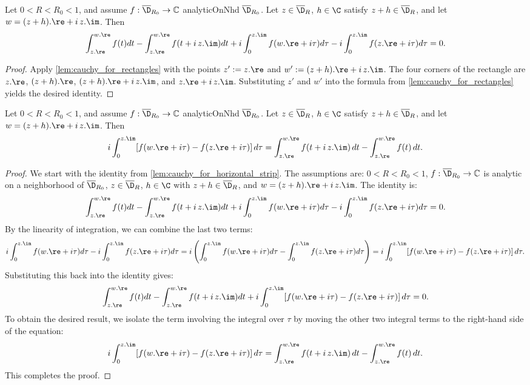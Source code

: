 \begin{lemma} \label{lem:cauchy_for_horizontal_strip}
\leanok
Let $0<R<R_0<1$, and assume $f:\overline{\D}_{R_0}\to\mathbb{C}$ analyticOnNhd $\overline{\D}_{R_0}$. Let $z \in \overline{\D}_R$, $h\in\C$ satisfy $z+h \in \overline{\D}_R$, and let $w = (z+h).\re + i\,z.\im$. Then
\[ \int_{z.\re}^{w.\re} f(t) dt - \int_{z.\re}^{w.\re} f(t + i\,z.\im) dt + i \int_{0}^{z.\im} f(w.\re + i\tau) d\tau - i \int_{0}^{z.\im} f(z.\re + i\tau) d\tau = 0. \]
\end{lemma}
\begin{proof}
\leanok
Apply \cref{lem:cauchy_for_rectangles} with the points $z' := z.\re$ and $w' := (z+h).\re + i\,z.\im$. The four corners of the rectangle are $z.\re$, $(z+h).\re$, $(z+h).\re + i\,z.\im$, and $z.\re + i\,z.\im$. Substituting $z'$ and $w'$ into the formula from \cref{lem:cauchy_for_rectangles} yields the desired identity.
\end{proof}

\begin{lemma}\label{lem:cauchy_rearrangement_step1}
\leanok
Let $0<R<R_0<1$, and assume $f:\overline{\D}_{R_0}\to\mathbb{C}$ analyticOnNhd $\overline{\D}_{R_0}$. Let $z \in \overline{\D}_R$, $h\in\C$ satisfy $z+h \in \overline{\D}_R$, and let $w = (z+h).\re + i\,z.\im$. Then
\[ i \int_0^{z.\im} [f(w.\re + i\tau) - f(z.\re + i\tau)]\,d\tau = \int_{z.\re}^{w.\re} f(t + i\,z.\im)\,dt - \int_{z.\re}^{w.\re} f(t)\,dt. \]
\end{lemma}
\begin{proof}\leanok
{}
We start with the identity from \cref{lem:cauchy_for_horizontal_strip}. The assumptions are: $0<R<R_0<1$, $f:\overline{\D}_{R_0}\to\mathbb{C}$ is analytic on a neighborhood of $\overline{\D}_{R_0}$, $z \in \overline{\D}_R$, $h\in\C$ with $z+h \in \overline{\D}_R$, and $w = (z+h).\re + i\,z.\im$. The identity is:
\[ \int_{z.\re}^{w.\re} f(t) dt - \int_{z.\re}^{w.\re} f(t + i\,z.\im) dt + i \int_{0}^{z.\im} f(w.\re + i\tau) d\tau - i \int_{0}^{z.\im} f(z.\re + i\tau) d\tau = 0. \]
By the linearity of integration, we can combine the last two terms:
\[ i \int_{0}^{z.\im} f(w.\re + i\tau) d\tau - i \int_{0}^{z.\im} f(z.\re + i\tau) d\tau = i \left( \int_{0}^{z.\im} f(w.\re + i\tau) d\tau - \int_{0}^{z.\im} f(z.\re + i\tau) d\tau \right) = i \int_0^{z.\im} [f(w.\re + i\tau) - f(z.\re + i\tau)]\,d\tau. \]
Substituting this back into the identity gives:
\[ \int_{z.\re}^{w.\re} f(t) dt - \int_{z.\re}^{w.\re} f(t + i\,z.\im) dt + i \int_0^{z.\im} [f(w.\re + i\tau) - f(z.\re + i\tau)]\,d\tau = 0. \]
To obtain the desired result, we isolate the term involving the integral over $\tau$ by moving the other two integral terms to the right-hand side of the equation:
\[ i \int_0^{z.\im} [f(w.\re + i\tau) - f(z.\re + i\tau)]\,d\tau = \int_{z.\re}^{w.\re} f(t + i\,z.\im)\,dt - \int_{z.\re}^{w.\re} f(t)\,dt. \]
This completes the proof.
\end{proof}

